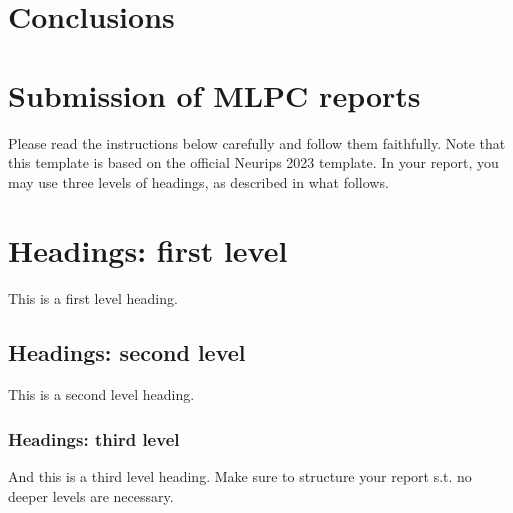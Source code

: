 \documentclass{article}
\begin{document}
\subsection{}
\label{sec:Text Features:c}




\section{Conclusions}
\label{sec:Conclusions}

\subsection{}
\label{sec:Conclusions:a}

\subsection{}
\label{sec:Conclusions:c}




\pagebreak
\section{Submission of MLPC reports}

Please read the instructions below carefully and follow them faithfully. Note that this template is based on the official Neurips 2023 template. In your report, you may use three levels of headings, as described in what follows. 

\section{Headings: first level}
\label{sec:headings}

This is a first level heading. 

\subsection{Headings: second level}

This is a second level heading. 


\subsubsection{Headings: third level}

And this is a third level heading. Make sure to structure your report s.t. no deeper levels are necessary. 
\end{document}

